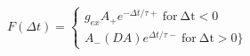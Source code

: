 $F(\Delta t) =  \begin{cases} g_{ex} A_{+} e^{−\Delta t/τ+}\:\mathrm{for\:\Delta t <0}\\A_{-}(DA) e^{\Delta t/τ-}\:\mathrm{for\:\Delta t > 0}\} \end{cases}$
 